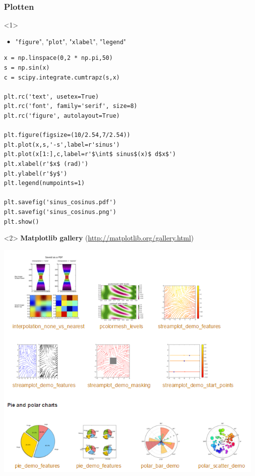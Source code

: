 \documentclass[t]{beamer}
\begin{document}
\begin{frame}[fragile]
	\frametitle{Plotten}
	
\begin{onlyenv}<1>
	\begin{itemize}
		\item "\lstinline{figure}", "\lstinline{plot}", "\lstinline{xlabel}", "\lstinline{legend}"
	\end{itemize}

	\begin{lstlisting}
x = np.linspace(0,2 * np.pi,50)
s = np.sin(x)
c = scipy.integrate.cumtrapz(s,x)

plt.rc('text', usetex=True)
plt.rc('font', family='serif', size=8)
plt.rc('figure', autolayout=True)

plt.figure(figsize=(10/2.54,7/2.54))
plt.plot(x,s,'-s',label=r'sinus')
plt.plot(x[1:],c,label=r'$\int$ sinus$(x)$ d$x$')
plt.xlabel(r'$x$ (rad)')
plt.ylabel(r'$y$')
plt.legend(numpoints=1)

plt.savefig('sinus_cosinus.pdf')
plt.savefig('sinus_cosinus.png')
plt.show()
	\end{lstlisting}
\end{onlyenv}
\begin{onlyenv}<2>
	\textbf{Matplotlib gallery} \small{(\url{http://matplotlib.org/gallery.html})}
	
	\center
	\includegraphics[height=0.8\textheight]{fig/matplotlibgallery}
	
\end{onlyenv}
\end{frame}
\end{document}
